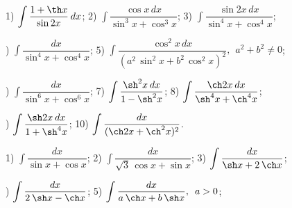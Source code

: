 \documentclass{article}
\begin{document}
\par{} 1) $ \displaystyle \int \dfrac{1+{\th x}}{{\sin 2x}}\hspace{2pt}dx $; \hspace{10pt}
2) $ \displaystyle \int \dfrac{{\cos x}\hspace{2pt}dx}{{\sin^3x}+{\cos^3x}} $; \hspace{10pt}
3) $ \displaystyle \int \dfrac{{\sin 2x}\hspace{2pt}dx}{{\sin^4x}+{\cos^4x}} $;

\par{}) $ \displaystyle \int \dfrac{dx}{{\sin^4x}+{\cos^4x}} $; \hspace{10pt}
5) $ \displaystyle \int \dfrac{{\cos^2x}\hspace{2pt}dx}{(a^2\hspace{2pt}{\sin^2x}+b^2\hspace{2pt}{\cos^2x})^2},
\hspace{5pt} a^2+b^2 \ne 0 $;

\par{}) $ \displaystyle \int \dfrac{dx}{{\sin^6x}+{\cos^6x}} $; \hspace{10pt}
7) $ \displaystyle \int \dfrac{{\sh^2x}\hspace{2pt}dx}{1-{\sh^2x}} $; \hspace{10pt}
8) $ \displaystyle \int \dfrac{{\ch 2x}\hspace{2pt}dx}{{\sh^4x}+{\ch^4x}} $;

\par{}) $ \displaystyle \int \dfrac{{\sh 2x}\hspace{2pt}dx}{1+{\sh^4x}} $; \hspace{10pt}
10) $ \displaystyle \int \dfrac{dx}{({\ch 2x}+{\ch^2x})^2} $.

\par{} 1) $ \displaystyle \int \dfrac{dx}{{\sin x}+{\cos x}} $; \hspace{10pt}
2) $ \displaystyle \int \dfrac{dx}{\sqrt{3}\hspace{2pt}{\cos x}+{\sin x}} $; \hspace{10pt}
3) $ \displaystyle \int \dfrac{dx}{{\sh x}+2\hspace{2pt}{\ch x}} $;

\par{}) $ \displaystyle \int \dfrac{dx}{2\hspace{2pt}{\sh x}-{\ch x}} $; \hspace{10pt}
5) $ \displaystyle \int \dfrac{dx}{a\hspace{2pt}{\ch x}+b\hspace{2pt}{\sh x}}, \hspace{5pt} a>0 $; 
\end{document}
